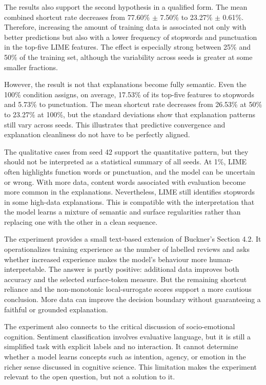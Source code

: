 \documentclass[11pt]{article}
\begin{document}
The results also support the second hypothesis in a qualified form. The mean combined shortcut rate decreases from 77.60\% $\pm$ 7.50\% to 23.27\% $\pm$ 0.61\%. Therefore, increasing the amount of training data is associated not only with better predictions but also with a lower frequency of stopwords and punctuation in the top-five LIME features. The effect is especially strong between 25\% and 50\% of the training set, although the variability across seeds is greater at some smaller fractions.

However, the result is not that explanations become fully semantic. Even the 100\% condition assigns, on average, 17.53\% of its top-five features to stopwords and 5.73\% to punctuation. The mean shortcut rate decreases from 26.53\% at 50\% to 23.27\% at 100\%, but the standard deviations show that explanation patterns still vary across seeds. This illustrates that predictive convergence and explanation cleanliness do not have to be perfectly aligned.

The qualitative cases from seed 42 support the quantitative pattern, but they should not be interpreted as a statistical summary of all seeds. At 1\%, LIME often highlights function words or punctuation, and the model can be uncertain or wrong. With more data, content words associated with evaluation become more common in the explanations. Nevertheless, LIME still identifies stopwords in some high-data explanations. This is compatible with the interpretation that the model learns a mixture of semantic and surface regularities rather than replacing one with the other in a clean sequence.

The experiment provides a small text-based extension of Buckner's Section 4.2. It operationalizes training experience as the number of labelled reviews and asks whether increased experience makes the model's behaviour more human-interpretable. The answer is partly positive: additional data improves both accuracy and the selected surface-token measure. But the remaining shortcut reliance and the non-monotonic local-surrogate scores support a more cautious conclusion. More data can improve the decision boundary without guaranteeing a faithful or grounded explanation.

The experiment also connects to the critical discussion of socio-emotional cognition. Sentiment classification involves evaluative language, but it is still a simplified task with explicit labels and no interaction. It cannot determine whether a model learns concepts such as intention, agency, or emotion in the richer sense discussed in cognitive science. This limitation makes the experiment relevant to the open question, but not a solution to it.
\end{document}
